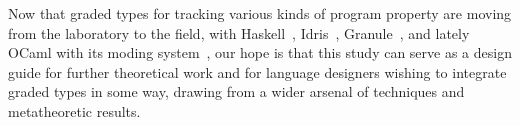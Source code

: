 Now that graded types for tracking various kinds of program property are moving
from the laboratory to the field, with Haskell~\cite{DBLP:journals/pacmpl/BernardyBNJS18}, Idris~\cite{DBLP:conf/ecoop/Brady21}, Granule~\cite{DBLP:journals/pacmpl/OrchardLE19}, and lately OCaml with its moding system~\cite{DBLP:journals/pacmpl/LorenzenWDEL24,DBLP:journals/pacmpl/GeorgesPEWDECPD25},
our hope is that this study can serve as a design guide for
further theoretical work and for language designers wishing to integrate graded types
in some way, drawing from a wider arsenal of techniques and metatheoretic results.
